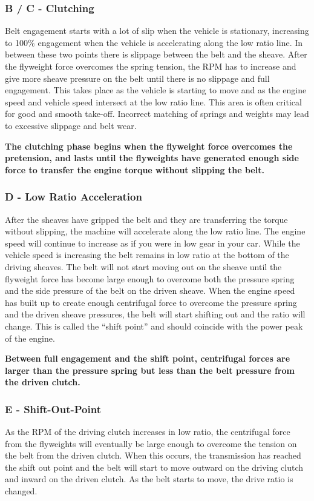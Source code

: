 \documentclass[12pt, titlepage]{article}
\begin{document}
\subsubsection*{B / C - Clutching}

Belt engagement starts with a lot of slip when the vehicle is stationary, increasing to 100\% engagement when the vehicle is accelerating along the low ratio line. In between these two points there is slippage between the belt and the sheave. After the flyweight force overcomes the spring tension, the RPM has to increase and give more sheave pressure on the belt until there is no slippage and full engagement. This takes place as the vehicle is starting to move and as the engine speed and vehicle speed intersect at the low ratio line. This area is often critical for good and smooth take-off. Incorrect matching of springs and weights may lead to excessive slippage and belt wear.

\textbf{The clutching phase begins when the flyweight force overcomes the pretension, and lasts until the flyweights have generated enough side force to transfer the engine torque without slipping the belt.}

\subsubsection*{D - Low Ratio Acceleration}

After the sheaves have gripped the belt and they are transferring the torque without slipping, the machine will accelerate along the low ratio line. The engine speed will continue to increase as if you were in low gear in your car. While the vehicle speed is increasing the belt remains in low ratio at the bottom of the driving sheaves. The belt will not start moving out on the sheave until the flyweight force has become large enough to overcome both the pressure spring and the side pressure of the belt on the driven sheave. When the engine speed has built up to create enough centrifugal force to overcome the pressure spring and the driven sheave pressures, the belt will start shifting out and the ratio will change. This is called the “shift point” and should coincide with the power peak of the engine.

\textbf{Between full engagement and the shift point, centrifugal forces are larger than the pressure spring but less than the belt pressure from the driven clutch.}

\subsubsection*{E - Shift-Out-Point}
As the RPM of the driving clutch increases in low ratio, the centrifugal force from the flyweights will eventually be large enough to overcome the tension on the belt from the driven clutch. When this occurs, the transmission has reached the shift out point and the belt will start to move outward on the driving clutch and inward on the driven clutch. As the belt starts to move, the drive ratio is changed.
\end{document}

